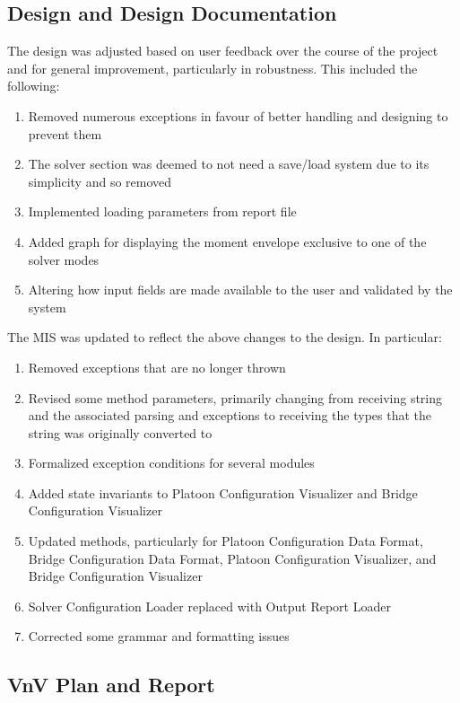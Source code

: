 \documentclass{article}
\begin{document}
\subsection{Design and Design Documentation}
The design was adjusted based on user feedback over the course of the project and for general improvement, particularly in robustness. This included the following:
\begin{enumerate}
  \item Removed numerous exceptions in favour of better handling and designing to prevent them
  \item The solver section was deemed to not need a save/load system due to its simplicity and so removed
  \item Implemented loading parameters from report file
  \item Added graph for displaying the moment envelope exclusive to one of the solver modes
  \item Altering how input fields are made available to the user and validated by the system
\end{enumerate}

The MIS was updated to reflect the above changes to the design. In particular:
\begin{enumerate}
  \item Removed exceptions that are no longer thrown
  \item Revised some method parameters, primarily changing from receiving string and the associated parsing and exceptions to receiving the types that the string was originally converted to
  \item Formalized exception conditions for several modules
  \item Added state invariants to Platoon Configuration Visualizer and Bridge Configuration Visualizer
  \item Updated methods, particularly for Platoon Configuration Data Format, Bridge Configuration Data Format, Platoon Configuration Visualizer, and Bridge Configuration Visualizer
  \item Solver Configuration Loader replaced with Output Report Loader
  \item Corrected some grammar and formatting issues
\end{enumerate}

\subsection{VnV Plan and Report}
\end{document}
